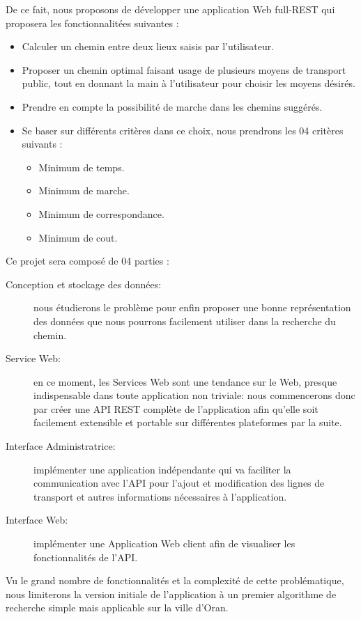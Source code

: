 De ce fait, nous proposons de développer une application Web full-REST qui proposera les fonctionnalitées suivantes : 

\begin{itemize}
	\item Calculer un chemin entre deux lieux saisis par l'utilisateur.
	\item Proposer un chemin optimal faisant usage de plusieurs moyens de transport public, tout en donnant la main à l'utilisateur pour choisir les moyens désirés.
	\item Prendre en compte la possibilité de marche dans les chemins suggérés.
	\item Se baser sur différents critères dans ce choix, nous prendrons les 04 critères suivants : 
	\begin{itemize}
		\item Minimum de temps.
		\item Minimum de marche.
		\item Minimum de correspondance.
		\item Minimum de cout.
	\end{itemize}	 
\end{itemize}

Ce projet sera composé de 04 parties :
\begin{description}
	\item[Conception et stockage des données: ] nous étudierons le problème pour enfin proposer une bonne représentation des données que nous pourrons facilement utiliser dans la recherche du chemin.

	\item[Service Web: ] en ce moment, les Services Web sont une tendance sur le Web, presque indispensable dans toute application non triviale: nous commencerons donc par créer une API REST complète de l'application afin qu'elle soit facilement extensible et portable sur différentes plateformes par la suite.
	
	\item[Interface Administratrice: ] implémenter une application indépendante qui va faciliter la  communication avec l'API pour l'ajout et modification des lignes de transport et autres informations nécessaires à l'application.
	
	
	\item[Interface Web: ] implémenter une Application Web client afin de visualiser les fonctionnalités de l'API.
\end{description}

Vu le grand nombre de fonctionnalités et la complexité de cette problématique, nous limiterons la version initiale de l'application à un premier algorithme de recherche simple mais applicable sur la ville d'Oran.

